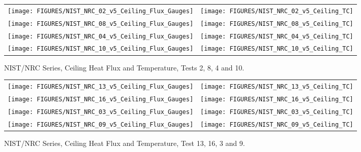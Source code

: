 \begin{figure}[p]
\begin{tabular*}{\textwidth}{l@{\extracolsep{\fill}}r}
\texttt{[image: FIGURES/NIST\_NRC\_02\_v5\_Ceiling\_Flux\_Gauges]} &
\texttt{[image: FIGURES/NIST\_NRC\_02\_v5\_Ceiling\_TC]} \\
\texttt{[image: FIGURES/NIST\_NRC\_08\_v5\_Ceiling\_Flux\_Gauges]} &
\texttt{[image: FIGURES/NIST\_NRC\_08\_v5\_Ceiling\_TC]} \\
\texttt{[image: FIGURES/NIST\_NRC\_04\_v5\_Ceiling\_Flux\_Gauges]} &
\texttt{[image: FIGURES/NIST\_NRC\_04\_v5\_Ceiling\_TC]} \\
\texttt{[image: FIGURES/NIST\_NRC\_10\_v5\_Ceiling\_Flux\_Gauges]} &
\texttt{[image: FIGURES/NIST\_NRC\_10\_v5\_Ceiling\_TC]}

\end{tabular*}
\caption{NIST/NRC Series, Ceiling Heat Flux and Temperature, Tests 2, 8, 4 and 10.}
\label{NIST_NRC_Ceiling_2}
\end{figure}

\begin{figure}[p]
\begin{tabular*}{\textwidth}{l@{\extracolsep{\fill}}r}
\texttt{[image: FIGURES/NIST\_NRC\_13\_v5\_Ceiling\_Flux\_Gauges]} &
\texttt{[image: FIGURES/NIST\_NRC\_13\_v5\_Ceiling\_TC]} \\
\texttt{[image: FIGURES/NIST\_NRC\_16\_v5\_Ceiling\_Flux\_Gauges]} &
\texttt{[image: FIGURES/NIST\_NRC\_16\_v5\_Ceiling\_TC]} \\
\texttt{[image: FIGURES/NIST\_NRC\_03\_v5\_Ceiling\_Flux\_Gauges]} &
\texttt{[image: FIGURES/NIST\_NRC\_03\_v5\_Ceiling\_TC]} \\
\texttt{[image: FIGURES/NIST\_NRC\_09\_v5\_Ceiling\_Flux\_Gauges]} &
\texttt{[image: FIGURES/NIST\_NRC\_09\_v5\_Ceiling\_TC]}

\end{tabular*}
\caption{NIST/NRC Series, Ceiling Heat Flux and Temperature, Test 13, 16, 3 and 9.}
\label{NIST_NRC_Ceiling_3}
\end{figure}

